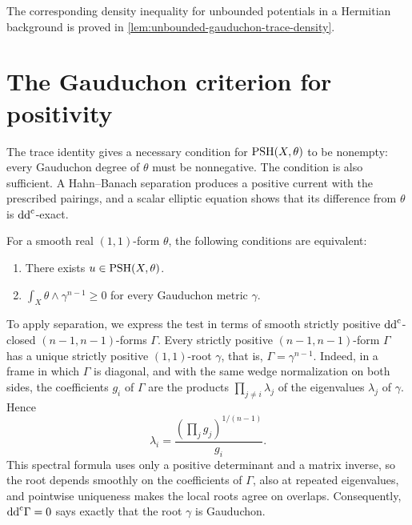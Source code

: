 The corresponding density inequality for unbounded potentials in a Hermitian background is proved in \cref{lem:unbounded-gauduchon-trace-density}.

\section{The Gauduchon criterion for positivity}

The trace identity gives a necessary condition for $\mathrm{PSH}(X,\theta)$ to be nonempty: every Gauduchon degree of $\theta$ must be nonnegative. The condition is also sufficient. A Hahn--Banach separation produces a positive current with the prescribed pairings, and a scalar elliptic equation shows that its difference from $\theta$ is $\mathrm{dd}^{\mathrm{c}}$-exact.

\begin{theorem}
\label{thm:lamari}
For a smooth real $(1,1)$-form $\theta$, the following conditions are equivalent:
\begin{enumerate}
\item There exists $u\in\mathrm{PSH}(X,\theta)$.
\item $\int_X\theta\wedge\gamma^{n-1}\geq0$ for every Gauduchon metric $\gamma$.
\end{enumerate}
\end{theorem}

To apply separation, we express the test in terms of smooth strictly positive $\mathrm{dd}^{\mathrm{c}}$-closed $(n-1,n-1)$-forms $\Gamma$. Every strictly positive $(n-1,n-1)$-form $\Gamma$ has a unique strictly positive $(1,1)$-root $\gamma$, that is, $\Gamma=\gamma^{n-1}$. Indeed, in a frame in which $\Gamma$ is diagonal, and with the same wedge normalization on both sides, the coefficients $g_i$ of $\Gamma$ are the products $\prod_{j\neq i}\lambda_j$ of the eigenvalues $\lambda_j$ of $\gamma$. Hence
\[
 \lambda_i=\frac{(\prod_jg_j)^{1/(n-1)}}{g_i}.
\]
This spectral formula uses only a positive determinant and a matrix inverse, so the root depends smoothly on the coefficients of $\Gamma$, also at repeated eigenvalues, and pointwise uniqueness makes the local roots agree on overlaps. Consequently, $\mathrm{dd}^{\mathrm{c}}\Gamma=0$ says exactly that the root $\gamma$ is Gauduchon.

